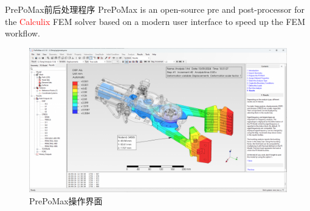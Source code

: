 \documentclass[lang=en,aspectratio=43,theme=default,logo=on]{simplebeamer}
\begin{document}
\begin{frame}{PrePoMax前后处理程序}
    PrePoMax is an open-source pre and post-processor for the \textcolor{red}{Calculix} FEM solver based on a modern user interface to speed up the FEM workflow. \\
    \begin{figure}
        \centering %
        \includegraphics[height=0.5\textheight]{./img/prepomax.png}
        \caption{PrePoMax操作界面}
    \end{figure}
\end{frame}

\end{document}
